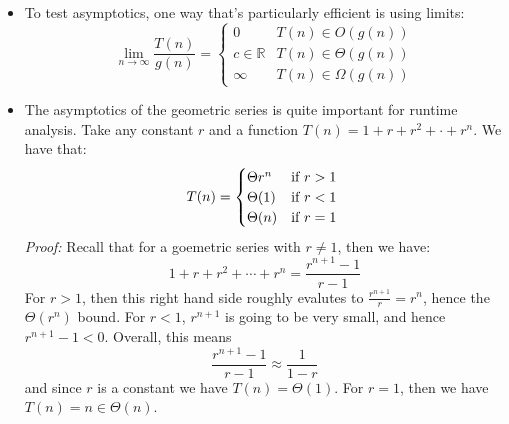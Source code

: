 \begin{itemize}
	\item To test asymptotics, one way that's particularly efficient is using limits: 
		\[
			\lim_{n \to \infty} \frac{T(n)}{g(n)} = \begin{cases}
				0 & T(n) \in O(g(n))\\
				c \in \mathbb R & T(n) \in \Theta(g(n))\\
				\infty & T(n) \in \Omega(g(n))
			\end{cases}
		\] 
	\item The asymptotics of the geometric series is quite important for runtime analysis. Take any constant \( r \) and 
		a function \( T(n) = 1 + r + r^2 + \cdot + r^{n} \). We have that:
		\[
		T(n) = \begin{cases}
			\Theta{r^{n}} & \text{if \( r > 1 \) }\\
			\Theta(1) & \text{if \( r < 1 \)}\\
			\Theta(n) & \text{if \( r = 1 \)}
		\end{cases}
		\] 
		\textit{Proof:} Recall that for a goemetric series with \( r \neq 1 \), then we have:
		\[
		1 + r + r^2 + \cdots + r^{n} = \frac{r^{n+1} - 1}{r-1}
		\] 
		For \( r > 1 \), then this right hand side roughly evalutes to \( \frac{r^{n + 1}}{r} = r^{n} \), hence the 
		\( \Theta(r^n) \) bound. For \( r < 1 \), \( r^{n + 1} \) is going to be very small, and hence \( r^{n + 1} - 1 < 0\). 
		Overall, this means 
		\[
			\frac{r^{n + 1} - 1}{r - 1} \approx \frac{1}{1 - r}
		\] 
		and since \( r \) is a constant we have \( T(n) = \Theta(1) \). For \( r = 1 \), then we have \( T(n) = n \in \Theta(n)\). 
\end{itemize}
